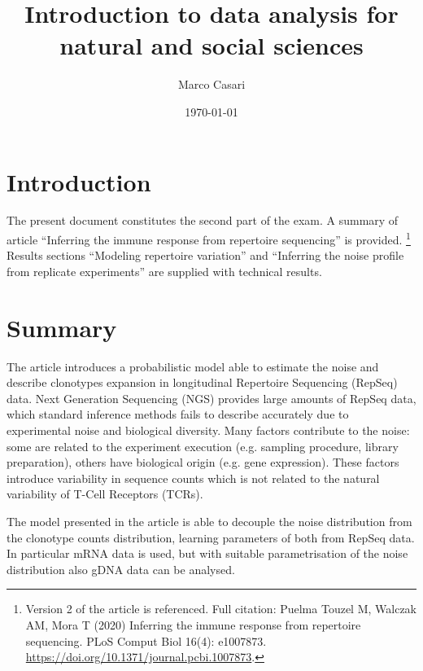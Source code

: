 \documentclass[a4paper,twocolumn]{article}
\title{Introduction to data analysis for natural and social sciences}
\author{Marco Casari}
\date{\today}
\begin{document}
\maketitle

\section{Introduction}
The present document constitutes the second part of the exam. A summary of article ``Inferring the immune response from repertoire sequencing'' is provided.%
\footnote{Version 2 of the article is referenced. Full citation: Puelma Touzel M, Walczak AM, Mora T (2020) Inferring the immune response from repertoire sequencing. PLoS Comput Biol 16(4): e1007873. \url{https://doi.org/10.1371/journal.pcbi.1007873}.}
Results sections ``Modeling repertoire variation'' and ``Inferring the noise profile from replicate experiments'' are supplied with technical results.



\section{Summary}
The article introduces a probabilistic model able to estimate the noise and describe clonotypes expansion in longitudinal Repertoire Sequencing (RepSeq) data.
Next Generation Sequencing (NGS) provides large amounts of RepSeq data, which standard inference methods fails to describe accurately due to experimental noise and biological diversity. Many factors contribute to the noise: some are related to the experiment execution (e.g. sampling procedure, library preparation), others have biological origin (e.g. gene expression). These factors introduce variability in sequence counts which is not related to the natural variability of T-Cell Receptors (TCRs).

The model presented in the article is able to decouple the noise distribution from the clonotype counts distribution, learning parameters of both from RepSeq data. In particular mRNA data is used, but with suitable  parametrisation of the noise distribution also gDNA data can be analysed.
\end{document}
